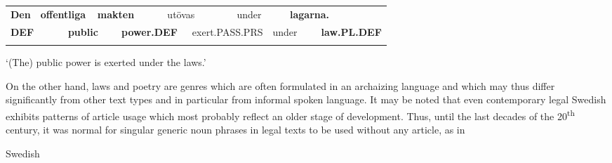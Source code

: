 \begin{tabular}{llllllllllll}
\lsptoprule
{\bfseries Den} & \multicolumn{2}{l}{{\bfseries offentliga}

} & \multicolumn{2}{l}{{\bfseries makten}

} & \multicolumn{2}{l}{utövas

} & \multicolumn{2}{l}{under

} & \multicolumn{2}{l}{{\bfseries lagarna.}

} & \\
\multicolumn{2}{l}{{\bfseries DEF}

} & \multicolumn{2}{l}{{\bfseries public}

} & \multicolumn{2}{l}{{\bfseries power.DEF}

} & \multicolumn{2}{l}{exert.PASS.PRS

} & \multicolumn{2}{l}{under

} & \multicolumn{2}{l}{{\bfseries law.PL.DEF}

}\\
\lspbottomrule
\end{tabular}

\begin{styleTranslation}
 ‘(The) public power is exerted under the laws.’

\end{styleTranslation}

\begin{styleBodyTextFirst}
On the other hand, laws and poetry are genres which are often formulated in an archaizing language and which may thus differ significantly from other text types and in particular from informal spoken language. It may be noted that even contemporary legal Swedish exhibits patterns of article usage which most probably reflect an older stage of development. Thus, until the last decades of the 20\textsuperscript{th} century, it was normal for singular generic noun phrases in legal texts to be used without any article, as in 

\end{styleBodyTextFirst}

\begin{listWWNumileveli}
\item {}

\begin{styleExample}
Swedish

\end{styleExample}

\end{listWWNumileveli}


